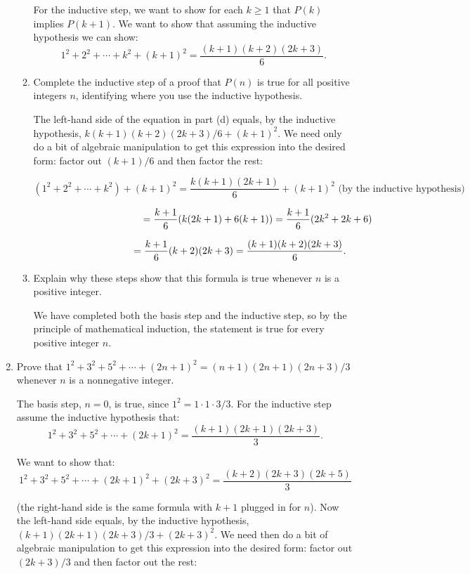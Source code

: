 \documentclass[11pt]{article}
\begin{document}
\begin{enumerate}[label=\textbf{\arabic*.}]
\begin{enumerate}[label=\textbf{\alph*)}]
		For the inductive step, we want to show for each $k \geq 1$ that $P(k)$ implies $P(k + 1)$. We want to show that assuming the inductive hypothesis we can show: $$1^2 + 2^2 + \cdots + k^2 + (k + 1)^2 = \frac{(k + 1)(k + 2)(2k + 3)}{6}.$$
		
		\item Complete the inductive step of a proof that $P(n)$ is true for all positive integers $n$, identifying where you use the inductive hypothesis.
		
		The left-hand side of the equation in part (d) equals, by the inductive hypothesis, $k(k + 1)(k + 2)(2k + 3) / 6 + (k + 1)^2$. We need only do a bit of algebraic manipulation to get this expression into the desired form: factor out $(k + 1) / 6$ and then factor the rest:
		
		$$(1^2 + 2^2 + \cdots + k^2) + (k + 1)^2 = \frac{k(k + 1)(2k + 1)}{6} + (k + 1)^2 \text{ (by the inductive hypothesis) }$$
		
		$$\hspace{3.9cm} = \frac{k + 1}{6}(k(2k + 1) + 6(k + 1)) = \frac{k + 1}{6}(2k^2 + 2k + 6)$$
		
		$$\hspace{3.3cm} = \frac{k + 1}{6}(k + 2)(2k + 3) = \frac{(k + 1)(k + 2)(2k + 3)}{6}.$$
		
		\item Explain why these steps show that this formula is true whenever $n$ is a positive integer.
		
		We have completed both the basis step and the inductive step, so by the principle of mathematical induction, the statement is true for every positive integer $n$.
	\end{enumerate}

	\pagebreak
	\item Prove that $1^2 + 3^2 + 5^2 + \cdots + (2n + 1)^2 = (n + 1)(2n + 1)(2n + 3) / 3$ whenever $n$ is a nonnegative integer.
	
	The basis step, $n = 0$, is true, since $1^2 = 1 \cdot 1 \cdot 3 / 3$. For the inductive step assume the inductive hypothesis that: $$1^2 + 3^2 + 5^2 + \cdots + (2k + 1)^2 = \frac{(k + 1)(2k + 1)(2k + 3)}{3}.$$
	
	We want to show that: $$1^2 + 3^2 + 5^2 + \cdots + (2k + 1)^2 + (2k + 3)^2 = \frac{(k + 2)(2k + 3)(2k + 5)}{3}$$
	
	(the right-hand side is the same formula with $k + 1$ plugged in for $n$). Now the left-hand side equals, by the inductive hypothesis, $(k + 1)(2k + 1)(2k + 3) / 3 + (2k + 3)^2$. We need then do a bit of algebraic manipulation to get this expression into the desired form: factor out $(2k + 3) / 3$ and then factor out the rest:
	

\end{enumerate}
\end{document}
